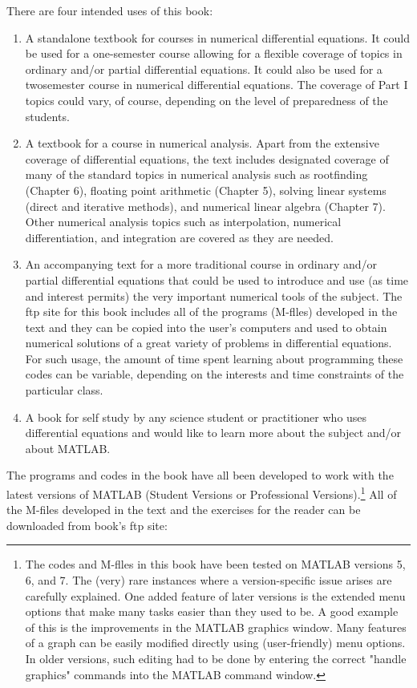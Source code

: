 \documentclass{book}
\begin{document}
There are four intended uses of this book: 
\begin{enumerate}
	\item A standalone textbook for courses in numerical differential equations. It could
be used for a one-semester course allowing for a flexible coverage of topics in
ordinary and/or partial differential equations. It could also be used for a twosemester course in numerical differential equations. The coverage of Part I topics
could vary, of course, depending on the level of preparedness of the students.
	\item A textbook for a course in numerical analysis. Apart from the extensive
coverage of differential equations, the text includes designated coverage of many
of the standard topics in numerical analysis such as rootfinding (Chapter 6),
floating point arithmetic (Chapter 5), solving linear systems (direct and iterative
methods), and numerical linear algebra (Chapter 7). Other numerical analysis
topics such as interpolation, numerical differentiation, and integration are covered
as they are needed.
	\item An accompanying text for a more traditional course in ordinary and/or partial
differential equations that could be used to introduce and use (as time and interest
permits) the very important numerical tools of the subject. The ftp site for this
book includes all of the programs (M-flles) developed in the text and they can be
copied into the user's computers and used to obtain numerical solutions of a great
variety of problems in differential equations. For such usage, the amount of time
spent learning about programming these codes can be variable, depending on the
interests and time constraints of the particular class.
	\item A book for self study by any science student or practitioner who uses differential
equations and would like to learn more about the subject and/or about MATLAB.

\end{enumerate}
The programs and codes in the book have all been developed to work with the
latest versions of MATLAB (Student Versions or Professional Versions).\footnote[1]{ The codes and M-flles in this book have been tested on MATLAB versions 5, 6, and 7. The (very)
rare instances where a version-specific issue arises are carefully explained. One added feature of later
versions is the extended menu options that make many tasks easier than they used to be. A good
example of this is the improvements in the MATLAB graphics window. Many features of a graph can
be easily modified directly using (user-friendly) menu options. In older versions, such editing had to
be done by entering the correct "handle graphics" commands into the MATLAB command window.}
 All of the M-files developed in the text and the exercises for the reader can be
downloaded from book's ftp site: 
\end{document}
